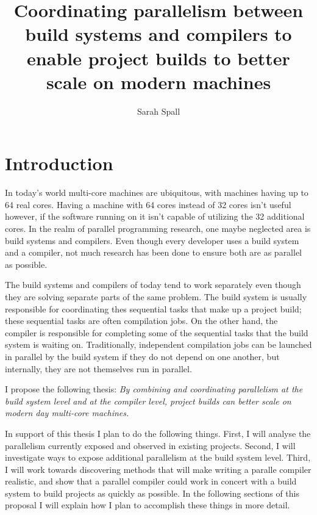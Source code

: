 \documentclass[10pt]{article}
\begin{document}
\title{Coordinating parallelism between build systems and compilers to enable project builds to better scale on modern machines}
\author{Sarah Spall}
\date{}
\maketitle

\section{Introduction}

In today's world multi-core machines are ubiquitous, with machines having up to 64 real cores.
Having a machine with 64 cores instead of 32 cores isn't useful however, if the software running
on it isn't capable of utilizing the 32 additional cores.  In the realm of parallel programming
research, one maybe neglected area is build systems and compilers.  Even though every developer
uses a build system and a compiler, not much research has been done to ensure both are as
parallel as possible.

The build systems and compilers of today tend to work separately even though they are
solving separate parts of the same problem.  The build system is usually responsible for coordinating
thes sequential tasks that make up a project build; these sequential tasks are often
compilation jobs.  On the other hand, the compiler is responsible for completing some of the sequential
tasks that the build system is waiting on.  Traditionally, independent compilation jobs can be
launched in parallel by the build system if they do not depend on one another, but internally,
they are not themselves run in parallel.

I propose the following thesis: \emph{By combining and coordinating parallelism at the build system level
and at the compiler level, project builds can better scale on modern day multi-core
machines.}

In support of this thesis I plan to do the following things.  First, I will analyse the parallelism
currently exposed and observed in existing projects.  Second, I will investigate ways to expose
additional parallelism at the build system level.  Third, I will work towards discovering methods
that will make writing a paralle compiler realistic, and show that a parallel compiler could work
in concert with a build system to build projects as quickly as possible.  In the following
sections of this proposal I will explain how I plan to accomplish these things in more detail.
\end{document}
